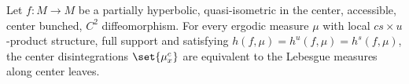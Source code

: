 \documentclass[../main]{subfiles}
\begin{document}
\begin{proposition}
  Let \(f \colon M \to M\) be a partially hyperbolic, quasi-isometric in the center, accessible, center bunched, \(C^2\) diffeomorphism. For every ergodic measure \(\mu\) with local \(cs \times u\)-product structure, full support and satisfying \(h(f,\mu) = h^u(f,\mu) = h^s(f,\mu)\), the center disintegrations \(\set{\mu^c_x}\) are equivalent to the Lebesgue measures along center leaves.
\end{proposition}

\end{document}
